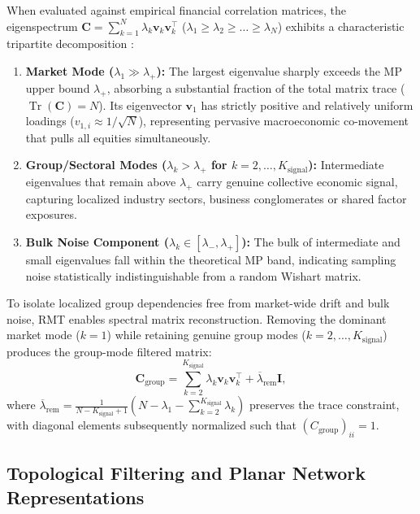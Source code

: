 When evaluated against empirical financial correlation matrices, the eigenspectrum $\mathbf{C} = \sum_{k=1}^N \lambda_k \mathbf{v}_k \mathbf{v}_k^{\top}$ ($\lambda_1 \ge \lambda_2 \ge \dots \ge \lambda_N$) exhibits a characteristic tripartite decomposition \cite{plerou_2002_random,bun_2017_cleaning}:
\begin{enumerate}
  \item \textbf{Market Mode ($\lambda_1 \gg \lambda_+$):} The largest eigenvalue sharply exceeds the MP upper bound $\lambda_+$, absorbing a substantial fraction of the total matrix trace ($\operatorname{Tr}(\mathbf{C}) = N$). Its eigenvector $\mathbf{v}_1$ has strictly positive and relatively uniform loadings ($v_{1,i} \approx 1/\sqrt{N}$), representing pervasive macroeconomic co-movement that pulls all equities simultaneously.
  \item \textbf{Group/Sectoral Modes ($\lambda_k > \lambda_+$ for $k = 2, \dots, K_{\mathrm{signal}}$):} Intermediate eigenvalues that remain above $\lambda_+$ carry genuine collective economic signal, capturing localized industry sectors, business conglomerates or shared factor exposures.
  \item \textbf{Bulk Noise Component ($\lambda_k \in [\lambda_-, \lambda_+]$):} The bulk of intermediate and small eigenvalues fall within the theoretical MP band, indicating sampling noise statistically indistinguishable from a random Wishart matrix.
\end{enumerate}

To isolate localized group dependencies free from market-wide drift and bulk noise, RMT enables spectral matrix reconstruction. Removing the dominant market mode ($k=1$) while retaining genuine group modes ($k = 2, \dots, K_{\mathrm{signal}}$) produces the group-mode filtered matrix:
\begin{equation}
\mathbf{C}_{\mathrm{group}} = \sum_{k=2}^{K_{\mathrm{signal}}} \lambda_k \mathbf{v}_k \mathbf{v}_k^{\top} + \overline{\lambda}_{\mathrm{rem}} \mathbf{I},
\label{eq:theory_c_group}
\end{equation}
where $\overline{\lambda}_{\mathrm{rem}} = \frac{1}{N - K_{\mathrm{signal}} + 1} \left( N - \lambda_1 - \sum_{k=2}^{K_{\mathrm{signal}}} \lambda_k \right)$ preserves the trace constraint, with diagonal elements subsequently normalized such that $(C_{\mathrm{group}})_{ii} = 1$.

\subsection{Topological Filtering and Planar Network Representations}
\label{subsec:theory_networks}

